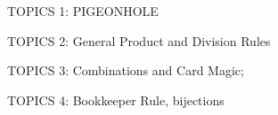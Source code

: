 \documentclass[handout]{mcs}
\begin{document}
\renewcommand{\reading}{
  Notes Ch.\bref{why_count_sec}--\bref{poker hands}
}


\begin{staffnotes}
  TOPICS 1: PIGEONHOLE
\end{staffnotes}


\begin{staffnotes}
TOPICS 2: General Product and Division Rules 
\end{staffnotes}


\begin{staffnotes}
TOPICS 3: Combinations and Card Magic; 
\end{staffnotes}

\begin{staffnotes}
TOPICS 4: Bookkeeper Rule, bijections
\end{staffnotes}


\end{document}
